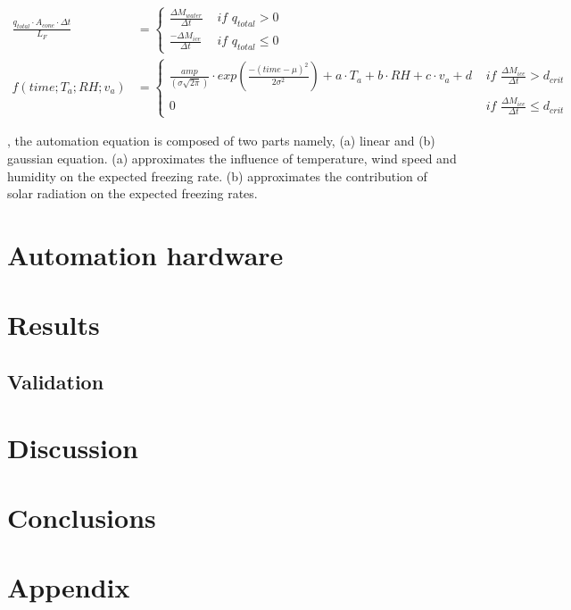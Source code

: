 \documentclass[utf8]{frontiersSCNS}
\begin{document}
\begin{subequations}
	\begin{align}
		\label{eqn:SW}
  \frac{q_{total} \cdot A_{cone} \cdot \Delta t}{L_F} & = \left\{ \begin{array}{ll}
		\frac{\Delta M_{water}}{\Delta t} & \textit{ if } q_{total} > 0 \\
		\frac{-\Delta M_{ice}}{\Delta t} & \textit{ if } q_{total} \leq 0
	\end{array} \right. \\
  f(time;T_a;RH;v_a) & = \left\{ \begin{array}{ll}
		\frac{amp}{(\sigma \sqrt{2\pi})} \cdot
    exp\left(\frac{-(time-\mu)^2}{2\sigma^2}\right) + a \cdot T_a + b \cdot RH + c \cdot v_a + d
    & \textit{ if } \frac{\Delta M_{ice}}{\Delta t} > d_{crit} \\
		0 & \textit{ if } \frac{\Delta M_{ice}}{\Delta t} \leq d_{crit}
	\end{array} \right.
	\end{align}
\end{subequations}


, the automation equation is composed of two parts namely, (a) linear and (b) gaussian equation. (a)
approximates the influence of temperature, wind speed and humidity on the expected freezing rate. (b)
approximates the contribution of solar radiation on the expected freezing rates.

\section{Automation hardware}

\section{Results}


\subsection{Validation}

\section{Discussion}

\section{Conclusions}

\section{Appendix}

 
\end{document}
